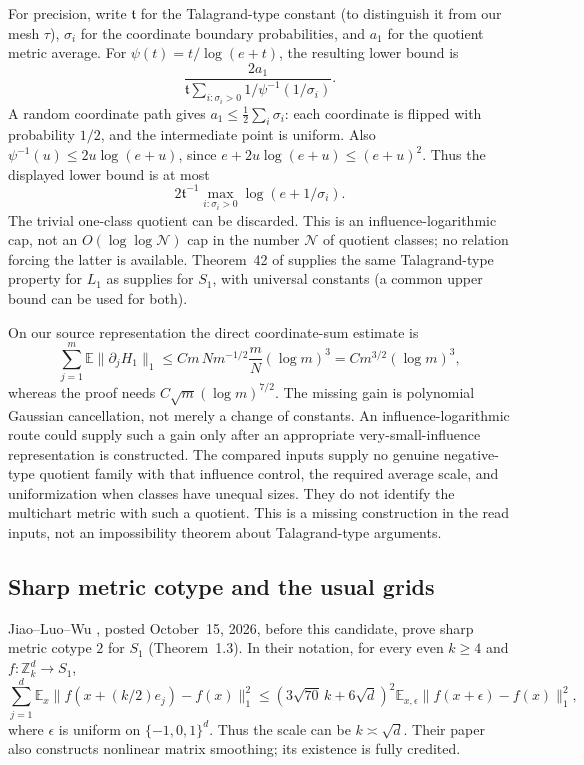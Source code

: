 \documentclass[11pt]{article}
\theoremstyle{remark}\newtheorem{remark}[theorem]{Remark}
\numberwithin{equation}{section}
\newcommand{\E}{\mathbb E}\newcommand{\Prob}{\mathbb P}
\newcommand{\norm}[1]{\lVert #1\rVert}
\begin{document}
For precision, write $\mathfrak t$ for the Talagrand-type constant
(to distinguish it from our mesh $\tau$), $\sigma_i$ for the coordinate
boundary probabilities, and $a_1$ for the quotient metric average. For
$\psi(t)=t/\log(e+t)$, the resulting lower bound is
\[
 \frac{2a_1}{\mathfrak t\sum_{i:\sigma_i>0}
                      1/\psi^{-1}(1/\sigma_i)}.
\]
A random coordinate path gives $a_1\le\frac12\sum_i\sigma_i$: each
coordinate is flipped with probability $1/2$, and the intermediate
point is uniform. Also $\psi^{-1}(u)\le2u\log(e+u)$, since
$e+2u\log(e+u)\le(e+u)^2$. Thus the displayed lower bound is at most
\begin{equation}\label{eq:influencecap}
 2\mathfrak t^{-1}\max_{i:\sigma_i>0}\log(e+1/\sigma_i).
\end{equation}
The trivial one-class quotient can be discarded. This is an
influence-logarithmic cap, not an $O(\log\log\mathcal N)$ cap in the
number $\mathcal N$ of quotient classes; no relation forcing the latter
is available. Theorem~42 of \cite{CEE} supplies the same Talagrand-type
property for $L_1$ as \cite{LWW} supplies for $S_1$, with universal
constants (a common upper bound can be used for both).

On our source representation the direct coordinate-sum estimate is
\[
 \sum_{j=1}^m\E\norm{\partial_jH_1}_1
 \le C m\,N m^{-1/2}\frac mN(\log m)^3
 =C m^{3/2}(\log m)^3,
\]
whereas the proof needs $C\sqrt m(\log m)^{7/2}$. The missing gain is
polynomial Gaussian cancellation, not merely a change of constants.
An influence-logarithmic route could supply such a gain only after an
appropriate very-small-influence representation is constructed. The
compared inputs supply no genuine negative-type quotient family with
that influence control, the required average scale, and uniformization
when classes have unequal sizes. They do not identify the multichart
metric with such a quotient. This is a missing construction in the read
inputs, not an impossibility theorem about Talagrand-type arguments.

\subsection{Sharp metric cotype and the usual grids}
Jiao--Luo--Wu \cite{JLW}, posted October~15, 2026, before this
candidate, prove sharp metric cotype $2$ for $S_1$ (Theorem~1.3). In their notation, for every even $k\ge4$ and
$f:\mathbb Z_k^d\to S_1$,
\[
 \sum_{j=1}^d\E_x\norm{f(x+(k/2)e_j)-f(x)}_1^2
 \le(3\sqrt{70}\,k+6\sqrt d)^2
       \E_{x,\epsilon}\norm{f(x+\epsilon)-f(x)}_1^2,
\]
where $\epsilon$ is uniform on $\{-1,0,1\}^d$. Thus the scale can be
$k\asymp\sqrt d$. Their paper also constructs nonlinear matrix
smoothing; its existence is fully credited.
\end{document}

